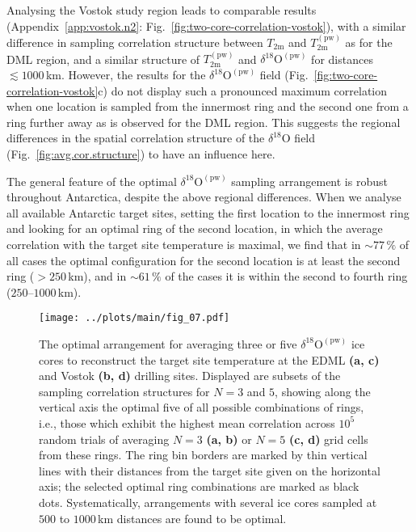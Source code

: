 \documentclass[cp, manuscript]{copernicus}
\begin{document}
Analysing the Vostok study region leads to comparable results
(Appendix~\ref{app:vostok.n2}: Fig.~\ref{fig:two-core-correlation-vostok}), with a
similar difference in sampling correlation structure between $T_{\mathrm{2m}}$
and $T_{\mathrm{2m}}^{\mathrm{(pw)}}$ as for the DML region, and a similar
structure of $T_{\mathrm{2m}}^{\mathrm{(pw)}}$ and
$\delta^{18}\mathrm{O}^{\mathrm{(pw)}}$ for distances $\lesssim1000$\,km.
However, the results for the $\delta^{18}\mathrm{O}^{\mathrm{(pw)}}$ field
(Fig.~\ref{fig:two-core-correlation-vostok}c) do not display such a pronounced
maximum correlation when one location is sampled from the innermost ring and the
second one from a ring further away as is observed for the DML region. This
suggests the regional differences in the spatial correlation structure of the
$\delta^{18}\mathrm{O}$ field (Fig.~\ref{fig:avg.cor.structure}) to have an
influence here.

The general feature of the optimal $\delta^{18}\mathrm{O}^{\mathrm{(pw)}}$
sampling arrangement is robust throughout Antarctica, despite the above regional
differences. When we analyse all available Antarctic target sites, setting the
first location to the innermost ring and looking for an optimal ring of the
second location, in which the average correlation with the target site
temperature is maximal, we find that in $\sim77\,\%$ of all cases the optimal
configuration for the second location is at least the second ring ($>250$\,km),
and in $\sim61\,\%$ of the cases it is within the second to fourth ring
($250$--$1000$\,km).

\begin{figure*}[t]%
\centering
\texttt{[image: ../plots/main/fig\_07.pdf]}
\caption{%
  The optimal arrangement for averaging three or five
  $\delta^{18}\mathrm{O}^{\mathrm{(pw)}}$ ice cores to reconstruct the target
  site temperature at the EDML \textbf{(a, c)} and Vostok \textbf{(b, d)}
  drilling sites. Displayed are subsets of the sampling correlation structures
  for $N=3$ and $5$, showing along the vertical axis the optimal five of all
  possible combinations of rings, i.e., those which exhibit the highest mean
  correlation across $10^5$ random trials of averaging $N=3$ \textbf{(a, b)} or
  $N=5$ \textbf{(c, d)} grid cells from these rings. The ring bin borders are
  marked by thin vertical lines with their distances from the target site given
  on the horizontal axis; the selected optimal ring combinations are marked as
  black dots. Systematically, arrangements with several ice cores sampled at
  $500$ to $1000$\,km distances are found to be optimal.}
\label{fig:binning}%
\end{figure*}%
\end{document}
